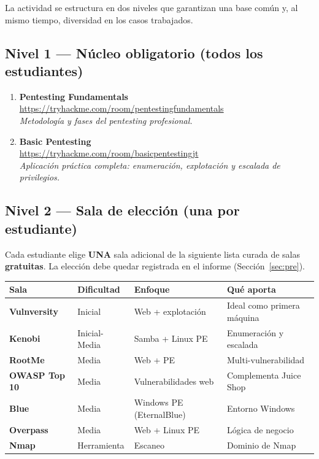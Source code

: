 \documentclass[11pt,a4paper]{article}
\begin{document}
La actividad se estructura en dos niveles que garantizan una base común y, al mismo tiempo, diversidad en los casos trabajados.

\subsection{Nivel 1 --- Núcleo obligatorio (todos los estudiantes)}
\begin{sala}
\begin{enumerate}[leftmargin=*]
  \item \textbf{Pentesting Fundamentals}\\
  \url{https://tryhackme.com/room/pentestingfundamentals}\\
  \textit{Metodología y fases del pentesting profesional.}

  \item \textbf{Basic Pentesting}\\
  \url{https://tryhackme.com/room/basicpentestingjt}\\
  \textit{Aplicación práctica completa: enumeración, explotación y escalada de privilegios.}
\end{enumerate}
\end{sala}

\subsection{Nivel 2 --- Sala de elección (una por estudiante)}
Cada estudiante elige \textbf{UNA} sala adicional de la siguiente lista curada de salas \textbf{gratuitas}. La elección debe quedar registrada en el informe (Sección~\ref{sec:pre}).

\begin{center}
\small
\renewcommand{\arraystretch}{1.3}
\begin{tabularx}{\textwidth}{@{} p{3cm} p{2.3cm} p{2.5cm} X @{}}
\toprule
\textbf{Sala} & \textbf{Dificultad} & \textbf{Enfoque} & \textbf{Qué aporta} \\
\midrule
\textbf{Vulnversity} & Inicial & Web + explotación & Ideal como primera máquina \\
\textbf{Kenobi} & Inicial-Media & Samba + Linux PE & Enumeración y escalada \\
\textbf{RootMe} & Media & Web + PE & Multi-vulnerabilidad \\
\textbf{OWASP Top 10} & Media & Vulnerabilidades web & Complementa Juice Shop \\
\textbf{Blue} & Media & Windows PE (EternalBlue) & Entorno Windows \\
\textbf{Overpass} & Media & Web + Linux PE & Lógica de negocio \\
\textbf{Nmap} & Herramienta & Escaneo & Dominio de Nmap \\
\bottomrule
\end{tabularx}
\end{center}
\end{document}
